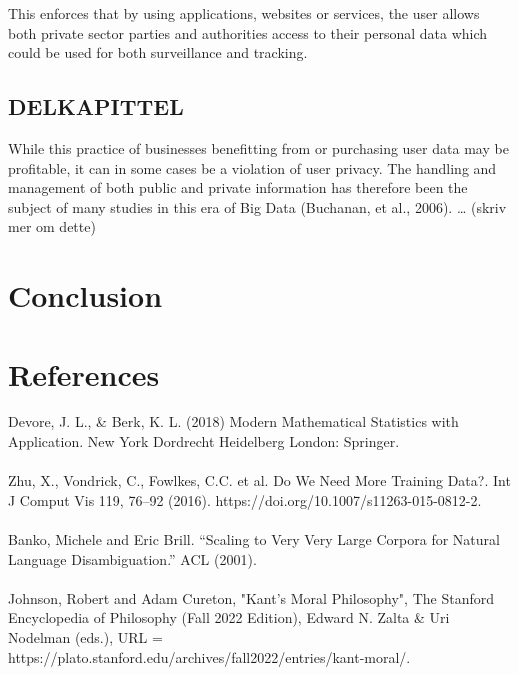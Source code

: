 \documentclass[11pt]{article}
\begin{document}
This enforces that by using applications, websites or services, the user allows both private sector parties and authorities access to their personal data which could be used for both surveillance and tracking. 

\subsection{DELKAPITTEL}
While this practice of businesses benefitting from or purchasing user data may be profitable, it can in some cases be a violation of user privacy. The handling and management of both public and private information has therefore been the subject of many studies in this era of Big Data (Buchanan, et al., 2006).  … (skriv mer om dette) 

\section{Conclusion}



%
%

\section{References}
Devore, J. L., \& Berk, K. L. (2018) Modern Mathematical Statistics with Application. New York Dordrecht Heidelberg London: Springer.\\ \\

Zhu, X., Vondrick, C., Fowlkes, C.C. et al. Do We Need More Training Data?. Int J Comput Vis 119, 76–92 (2016). https://doi.org/10.1007/s11263-015-0812-2. \\ \\

Banko, Michele and Eric Brill. “Scaling to Very Very Large Corpora for Natural Language Disambiguation.” ACL (2001).\\ \\

Johnson, Robert and Adam Cureton, "Kant’s Moral Philosophy", The Stanford Encyclopedia of Philosophy (Fall 2022 Edition), Edward N. Zalta \& Uri Nodelman (eds.), URL = https://plato.stanford.edu/archives/fall2022/entries/kant-moral/. \\ \\
\end{document}
